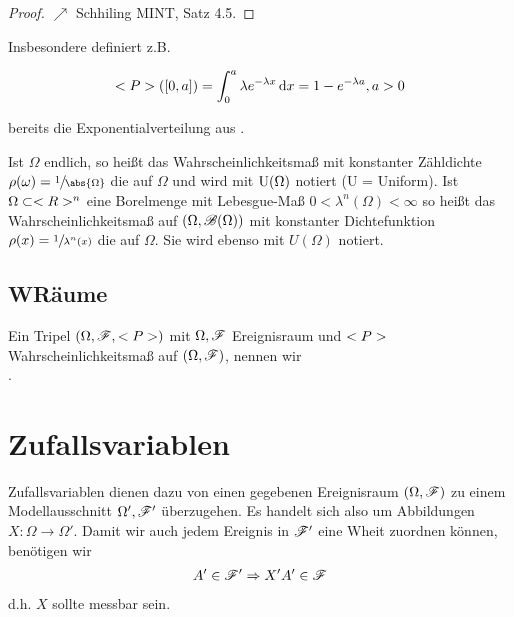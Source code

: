 \begin{proof}
	$\nearrow$ Schhiling MINT, Satz 4.5.
\end{proof}

Insbesondere definiert z.B.

\begin{align}
	<P>([0,a]) = \int_{0}^{a} \lambda e^{-\lambda x}\,\mathrm{d} x = 1 - e^{-\lambda a}, a > 0 \notag
\end{align}

bereits die Exponentialverteilung aus .

\begin{definition}[Gleichverteilung]
	Ist $\Omega$ endlich, so heißt das Wahrscheinlichkeitsmaß mit konstanter Zähldichte $\rho(\omega) = \sfrac{1}{\abs{\Omega}}$ die  auf $\Omega$ und wird mit $\operatorname{U}(\Omega)$ notiert (U = Uniform).
	Ist $\Omega \subset <R>^n$ eine Borelmenge mit Lebesgue-Maß $0 < \lambda^n(\Omega) < \infty$ so heißt das Wahrscheinlichkeitsmaß auf $(\Omega, \mathscr{B}(\Omega))$ mit konstanter Dichtefunktion $\rho(x) = \sfrac{1}{\lambda^n(x)}$ die  auf $\Omega$. 
	Sie wird ebenso mit $U(\Omega)$ notiert.
\end{definition}

\subsection*{WRäume}

\begin{definition}[Wahrscheinlichkeitsraum]
	Ein Tripel $(\Omega, \mathscr{F}, <P>)$ mit $\Omega, \mathscr{F}$ Ereignisraum und $<P>$ Wahrscheinlichkeitsmaß auf $(\Omega, \mathscr{F})$, nennen wir \\ .
\end{definition}

\section{Zufallsvariablen}

Zufallsvariablen dienen dazu von einen gegebenen Ereignisraum $(\Omega, \mathscr{F})$ zu einem Modellausschnitt $\Omega', \mathscr{F}'$ überzugehen. 
Es handelt sich also um Abbildungen $X: \Omega \to \Omega'$.
Damit wir auch jedem Ereignis in $\mathscr{F}'$ eine Wheit zuordnen können, benötigen wir	
\begin{align}
	A' \in \mathscr{F}' \Rightarrow X' A' \in \mathscr{F} \notag		
\end{align}
d.h. $X$ sollte messbar sein.

